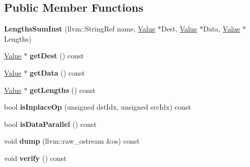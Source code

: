 \subsection*{Public Member Functions}
\begin{DoxyCompactItemize}
\item 
\mbox{\label{classglow_1_1_lengths_sum_inst_ab6b95ec78413bb198f1e4989cb89bbf1}} 
{\bfseries Lengths\+Sum\+Inst} (llvm\+::\+String\+Ref name, \hyperlink{classglow_1_1_value}{Value} $\ast$Dest, \hyperlink{classglow_1_1_value}{Value} $\ast$Data, \hyperlink{classglow_1_1_value}{Value} $\ast$Lengths)
\item 
\mbox{\label{classglow_1_1_lengths_sum_inst_a6c331904b71359500c7becc399b77e31}} 
\hyperlink{classglow_1_1_value}{Value} $\ast$ {\bfseries get\+Dest} () const
\item 
\mbox{\label{classglow_1_1_lengths_sum_inst_ae1525163aee3edcb8f29a717dff5ce0e}} 
\hyperlink{classglow_1_1_value}{Value} $\ast$ {\bfseries get\+Data} () const
\item 
\mbox{\label{classglow_1_1_lengths_sum_inst_af6bf2a3df903a70545c70eae42b42b45}} 
\hyperlink{classglow_1_1_value}{Value} $\ast$ {\bfseries get\+Lengths} () const
\item 
\mbox{\label{classglow_1_1_lengths_sum_inst_a73dc45ccfba81c889e93c99c90454bf7}} 
bool {\bfseries is\+Inplace\+Op} (unsigned dst\+Idx, unsigned src\+Idx) const
\item 
\mbox{\label{classglow_1_1_lengths_sum_inst_a47fdc073f041e8a30eace02e7eb06010}} 
bool {\bfseries is\+Data\+Parallel} () const
\item 
\mbox{\label{classglow_1_1_lengths_sum_inst_a6af4e43876e7d5e1e7112e3daa32fd13}} 
void {\bfseries dump} (llvm\+::raw\+\_\+ostream \&os) const
\item 
\mbox{\label{classglow_1_1_lengths_sum_inst_a3d5eb8f1299ad54fcf37e88a5b2c0539}} 
void {\bfseries verify} () const
\end{DoxyCompactItemize}
